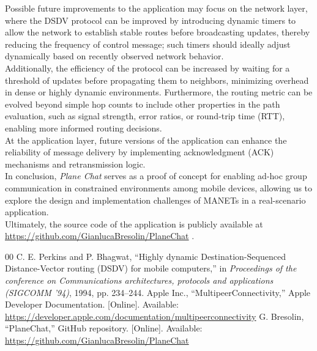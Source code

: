 \documentclass[conference]{IEEEtran}
\begin{document}
Possible future improvements to the application may focus on the network layer,
where the DSDV protocol can be improved by introducing dynamic timers to allow
the network to establish stable routes before broadcasting updates, thereby
reducing the frequency of control message; such timers should ideally adjust
dynamically based on recently observed network behavior. \\
Additionally, the efficiency of the protocol can be increased by waiting for a
threshold of updates before propagating them to neighbors, minimizing overhead
in dense or highly dynamic environments. 
Furthermore, the routing metric can be evolved beyond simple hop counts to
include other properties in the path evaluation, such as signal   
strength, error ratios, or round-trip time (RTT), enabling more informed routing
decisions. \\
At the application layer, future versions of the application can enhance the
reliability of message delivery by implementing acknowledgment (ACK) mechanisms
and retransmission logic.\\

In conclusion, \textit{Plane Chat} serves as a proof of concept for enabling 
ad-hoc group communication in constrained environments among mobile devices,
allowing us to explore the design and implementation challenges of MANETs in a
real-scenario application. \\
Ultimately, the source code of the application is publicly available at
\url{https://github.com/GianlucaBresolin/PlaneChat} \cite{b3}. \\


\begin{thebibliography}{00}
 C. E. Perkins and P. Bhagwat, ``Highly dynamic
Destination-Sequenced Distance-Vector routing (DSDV) for mobile computers,'' in
\textit{Proceedings of the conference on Communications architectures, protocols
and applications (SIGCOMM '94)}, 1994, pp. 234--244. 
 Apple Inc., ``MultipeerConnectivity,'' Apple Developer
Documentation. [Online]. Available:
\url{https://developer.apple.com/documentation/multipeerconnectivity} 
 G. Bresolin, ``PlaneChat,'' GitHub repository. [Online]. Available:
\url{https://github.com/GianlucaBresolin/PlaneChat} 
\end{thebibliography}
\end{document}
